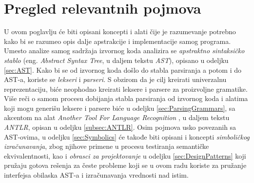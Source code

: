 \chapter{Pregled relevantnih pojmova}
\label{chp:RelevantTerms}

U ovom poglavlju će biti opisani koncepti i alati čije je razumevanje potrebno kako bi se razumeo opis dalje apstrakcije i implementacije samog programa. Umesto analize samog sadržaja izvornog koda analizira se \emph{apstraktno sintaksičko stablo} (eng. \emph{Abstract Syntax Tree}, u daljem tekstu \emph{AST}), opisano u odeljku \ref{sec:AST}. Kako bi se od izvornog koda došlo do stabla parsiranja a potom i do AST-a, koriste se \emph{lekseri} i \emph{parseri}. S obzirom da je cilj kreirati univerzalnu reprezentaciju, biće neophodno kreirati leksere i parsere za proizvoljne gramatike. Više reči o samom procesu dobijanja stabla parsiranja od izvornog koda i alatima koji mogu generišu leksere i parsere biće u odeljku \ref{sec:ParsingGrammars}, sa akcentom na alat \emph{Another Tool For Language Recognition} \cite{ANTLR}, u daljem tekstu \emph{ANTLR}, opisan u odeljku \ref{subsec:ANTLR}. Osim pojmova usko povezanih sa AST-ovima, u odeljku \ref{sec:Symbolics} će takođe biti opisani i koncepti \emph{simboličkog izračunavanja}, zbog njihove primene u procesu testiranja semantičke ekvivalentnosti, kao i \emph{obrasci za projektovanje} u odeljku \ref{sec:DesignPatterns} koji pružaju gotova rešenja za česte probleme koji se u ovom radu koriste za pružanje interfejsa obilaska AST-a i izračunavanja vrednosti nad istim.






